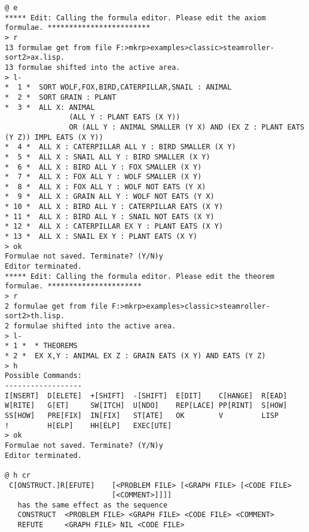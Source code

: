 {\begin{verbatim}
@ e
***** Edit: Calling the formula editor. Please edit the axiom formulae. ************************
> r
13 formulae get from file F:>mkrp>examples>classic>steamroller-sort2>ax.lisp.
13 formulae shifted into the active area.
> l-
*  1 *  SORT WOLF,FOX,BIRD,CATERPILLAR,SNAIL : ANIMAL
*  2 *  SORT GRAIN : PLANT
*  3 *  ALL X: ANIMAL 
               (ALL Y : PLANT EATS (X Y))
               OR (ALL Y : ANIMAL SMALLER (Y X) AND (EX Z : PLANT EATS (Y Z)) IMPL EATS (X Y))
*  4 *  ALL X : CATERPILLAR ALL Y : BIRD SMALLER (X Y)
*  5 *  ALL X : SNAIL ALL Y : BIRD SMALLER (X Y)
*  6 *  ALL X : BIRD ALL Y : FOX SMALLER (X Y)
*  7 *  ALL X : FOX ALL Y : WOLF SMALLER (X Y)
*  8 *  ALL X : FOX ALL Y : WOLF NOT EATS (Y X)
*  9 *  ALL X : GRAIN ALL Y : WOLF NOT EATS (Y X)
* 10 *  ALL X : BIRD ALL Y : CATERPILLAR EATS (X Y)
* 11 *  ALL X : BIRD ALL Y : SNAIL NOT EATS (X Y)
* 12 *  ALL X : CATERPILLAR EX Y : PLANT EATS (X Y)
* 13 *  ALL X : SNAIL EX Y : PLANT EATS (X Y)
> ok
Formulae not saved. Terminate? (Y/N)y
Editor terminated.
***** Edit: Calling the formula editor. Please edit the theorem formulae. **********************
> r
2 formulae get from file F:>mkrp>examples>classic>steamroller-sort2>th.lisp.
2 formulae shifted into the active area.
> l-
* 1 *  * THEOREMS
* 2 *  EX X,Y : ANIMAL EX Z : GRAIN EATS (X Y) AND EATS (Y Z)
> h
Possible Commands:
------------------
I[NSERT]  D[ELETE]  +[SHIFT]  -[SHIFT]  E[DIT]    C[HANGE]  R[EAD] 
W[RITE]   G[ET]     SW[ITCH]  U[NDO]    REP[LACE] PP[RINT]  S[HOW]
SS[HOW]   PRE[FIX]  IN[FIX]   ST[ATE]   OK        V         LISP 
!         H[ELP]    HH[ELP]   EXEC[UTE]
> ok
Formulae not saved. Terminate? (Y/N)y
Editor terminated.

@ h cr
 C[ONSTRUCT.]R[EFUTE]    [<PROBLEM FILE> [<GRAPH FILE> [<CODE FILE> 
                         [<COMMENT>]]]]
   has the same effect as the sequence
   CONSTRUCT  <PROBLEM FILE> <GRAPH FILE> <CODE FILE> <COMMENT>
   REFUTE     <GRAPH FILE> NIL <CODE FILE>


\end{verbatim}}
